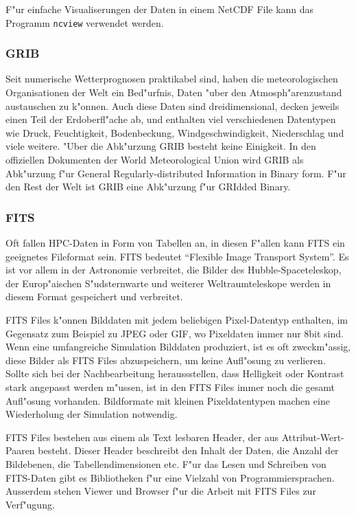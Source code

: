 F"ur einfache Visualiserungen der Daten in einem NetCDF File kann
das Programm {\tt ncview} verwendet werden.

\subsubsection{GRIB}
Seit numerische Wetterprognosen praktikabel sind, haben
die meteorologischen Organisationen der Welt ein Bed"urfnis,
Daten "uber den Atmosph"arenzustand austauschen zu k"onnen.
Auch diese Daten sind dreidimensional, decken jeweils einen Teil
der Erdoberfl"ache ab, und enthalten viel verschiedenen Datentypen
wie Druck, Feuchtigkeit, Bodenbeckung, Windgeschwindigkeit, Niederschlag
und viele weitere.
"Uber die Abk"urzung GRIB besteht keine Einigkeit.
In den offiziellen Dokumenten der World Meteorological Union wird GRIB
als Abk"urzung f"ur
General Regularly-distributed Information in Binary form. 
F"ur den Rest der Welt ist GRIB eine Abk"urzung f"ur GRIdded Binary.

\subsubsection{FITS}
Oft fallen HPC-Daten in Form von Tabellen an, in diesen F"allen
kann FITS ein geeignetes Fileformat sein. FITS bedeutet ``Flexible
Image Transport System''.
Es ist vor allem in der Astronomie verbreitet, die Bilder des
Hubble-Spaceteleskop, der Europ"aischen S"udsternwarte und weiterer
Weltraumteleskope werden in diesem Format gespeichert und verbreitet.

FITS Files k"onnen Bilddaten mit jedem beliebigen Pixel-Datentyp
enthalten, im Gegensatz zum Beispiel zu JPEG oder GIF, wo Pixeldaten
immer nur 8bit sind. Wenn eine umfangreiche Simulation Bilddaten
produziert, ist es oft zweckm"assig, diese Bilder als FITS Files
abzuspeichern, um keine Aufl"osung zu verlieren. Sollte sich bei
der Nachbearbeitung heraussstellen, dass Helligkeit oder Kontrast
stark angepasst werden m"ussen, ist in den FITS Files immer noch die
gesamt Aufl"osung vorhanden.
Bildformate mit kleinen Pixeldatentypen machen eine Wiederholung
der Simulation notwendig.

FITS Files bestehen aus einem als Text lesbaren Header, der aus
Attribut-Wert-Paaren besteht.
Dieser Header beschreibt den Inhalt der Daten, die Anzahl der
Bildebenen, die Tabellendimensionen etc.
F"ur das Lesen und Schreiben von FITS-Daten gibt es Bibliotheken
f"ur eine Vielzahl von Programmiersprachen.
Ausserdem stehen Viewer und Browser f"ur die Arbeit mit FITS Files
zur Verf"ugung. 


